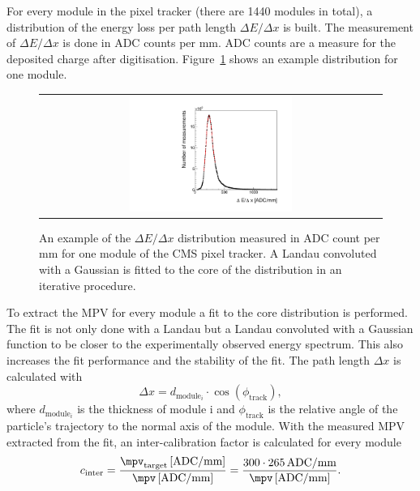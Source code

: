 For every module in the pixel tracker (there are 1440 modules in total), a distribution of the energy loss per path length $\Delta E/\Delta x$ is built.
The measurement of $\Delta E/\Delta x$ is done in ADC counts per mm.
ADC counts are a measure for the deposited charge after digitisation.
Figure~\ref{fig:dEdx_Module} shows an example distribution for one module. 
\begin{figure}[!b]
  \centering 
  \begin{tabular}{c}
  \includegraphics[width=0.49\textwidth]{figures/analysis/Landau_Module_352476680.pdf}
  \end{tabular}
  \caption{An example of the $\Delta E/\Delta x$ distribution measured in ADC count per mm for one module of the CMS pixel tracker. 
           A Landau convoluted with a Gaussian is fitted to the core of the distribution in an iterative procedure.} 
  \label{fig:dEdx_Module}
\end{figure}
To extract the MPV for every module a fit to the core distribution is performed.
The fit is not only done with a Landau but a Landau convoluted with a Gaussian function to be closer to the experimentally observed energy spectrum.
This also increases the fit performance and the stability of the fit.
The path length $\Delta x$ is calculated with
\begin{equation}
\Delta x = d_{\text{module}_i} \cdot \cos(\phi_{\text{track}}),
\end{equation}
where $d_{\text{module}_i}$ is the thickness of module i and $\phi_{\text{track}}$ is the relative angle of the particle's trajectory to the normal axis of the module.
With the measured MPV extracted from the fit, an inter-calibration factor is calculated for every module
\begin{equation}
c_{\text{inter}}=\frac{\mpv_{\text{target}}\, [\text{ADC/mm}]}{\mpv\, [\text{ADC/mm}]} = \frac{300 \cdot 265 \, \text{ADC/mm}}{\mpv\, [\text{ADC/mm}]}.
\end{equation}

